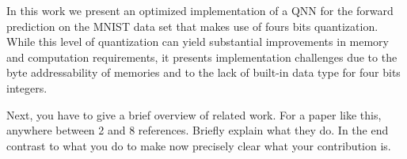 In this work we present an optimized implementation of a QNN for the forward prediction on the MNIST data set that makes use of fours bits quantization. While this level of quantization can yield substantial improvements in memory and computation requirements, it presents implementation challenges due to the byte addressability of memories and to the lack of built-in data type for four bits integers.

%
%

 Next, you have to give a brief overview of
related work. For a paper like this, anywhere between 2 and 8
references. Briefly explain what they do. In the end contrast to what
you do to make now precisely clear what your contribution is.
